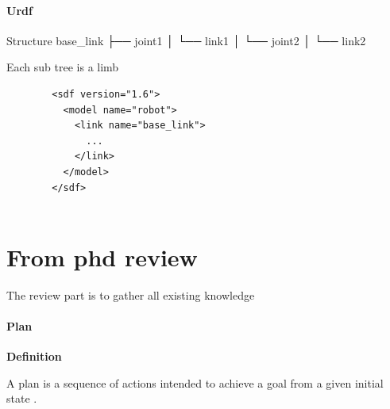 \documentclass{book}
\providecommand{\ProjectDeepHeading}[2]{%
    \par\medskip\noindent\textbf{#2}\par\smallskip
}
\begin{document}
\paragraph{Urdf}


Structure
    base\_link
         ├── joint1
         │    └── link1
         │         └── joint2
         │              └── link2
    
    Each sub tree is a limb




    \begin{verbatim}
        <sdf version="1.6">
          <model name="robot">
            <link name="base_link">
              ...
            </link>
          </model>
        </sdf>
        
    \end{verbatim}

\section{From phd review}






The review part is to gather all existing knowledge




















\paragraph{Plan}


\ProjectDeepHeading{2}{Definition}
      A plan is a sequence of actions intended to achieve a goal from a given
      initial state \cite{mcdermott-1999-using-regression-match-graphs-to-control-search-in-planning}.
      
\end{document}

